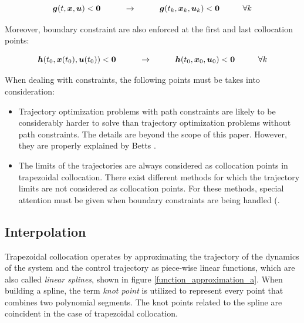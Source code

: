 \documentclass{thesisreport}
\begin{document}
 \begin{equation}
 \bm{g}(t, \bm{x},\bm{u}) < \bm{0} \text{\hspace{1cm}} \rightarrow \text{\hspace{1cm}} \bm{g}(t_k, \bm{x}_k, \bm{u}_k) <\bm{0} \text{\hspace{1cm}} \forall k \\
 \end{equation}
 
 Moreover, boundary constraint are also enforced at the first and last collocation points:
 
 \begin{equation}
 \bm{h}(t_0, \bm{x}(t_0),\bm{u}(t_0)) < \bm{0} \text{\hspace{1cm}} \rightarrow \text{\hspace{1cm}} \bm{h}(t_0, \bm{x}_0, \bm{u}_0) <\bm{0} \text{\hspace{1cm}} \forall k \\
 \end{equation} 
 
 
 When dealing with constraints, the following points must be takes into consideration: 
 
 \begin{itemize}
 	\item Trajectory optimization problems with path constraints are likely to be considerably harder to solve than trajectory optimization problems without path constraints. The details are beyond the scope of this paper. However, they are properly explained by Betts \cite{Betts2010}.
 	\item The limits of the trajectories are always considered as collocation points in trapezoidal collocation. There exist different methods for which the trajectory limits are not considered as collocation points. For these methods, special attention must be given when boundary constraints are being handled (\cite{Benson2006, Garg2010}.
 \end{itemize}
 
 \newpage
 
 
 \subsection{Interpolation}
 
 Trapezoidal collocation operates by approximating the trajectory of the dynamics of the system and the control trajectory as piece-wise linear functions, which are also called \textit{linear splines}, shown in figure \ref{function_approximation_a}. When building a spline, the term \textit{knot point} is utilized to represent every point that combines two polynomial segments. The knot points related to the spline are coincident in the case of trapezoidal collocation.  
 
\end{document}
